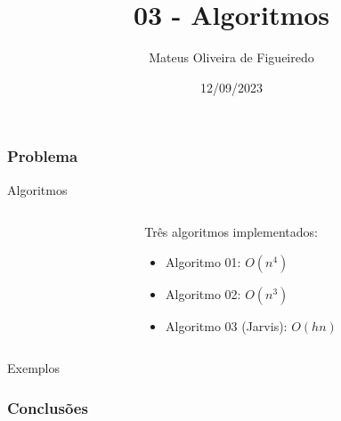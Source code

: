 \documentclass[aspectratio=169,usenames,dvipsnames]{beamer}
\title{03 - Algoritmos}
\author{Mateus Oliveira de Figueiredo}
\date{12/09/2023}
\begin{document}
\begin{frame}
\titlepage
\end{frame}

\begin{frame}
\frametitle{Problema}

\begin{overprint}
\end{overprint}
\end{frame}

\begin{frame}{Algoritmos}
  \begin{columns}
    \begin{column}{0.5\textwidth}
    \end{column}
    \begin{column}{0.5\textwidth}
      Três algoritmos implementados:
      \begin{itemize}
        \item<1-> Algoritmo 01: $O(n^4)$
        \item<2-> Algoritmo 02: $O(n^3)$
        \item<3-> Algoritmo 03 (Jarvis): $O(hn)$
      \end{itemize}
    \end{column}
  \end{columns}
\end{frame}


\begin{frame}{Exemplos}

\end{frame}

\begin{frame}
\frametitle{Conclusões}

\begin{itemize}
\end{itemize}

\end{frame}
\end{document}
